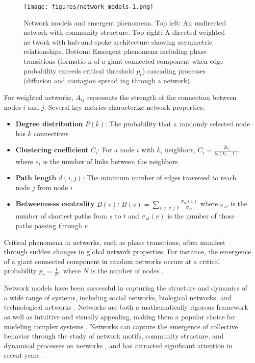 \begin{figure}[htbp]
    \centering
    \texttt{[image: figures/network\_models-1.png]}
    \caption{Network models and emergent phenomena. Top left: An undirected network with community structure. Top right: A directed weighted ne
    twork with hub-and-spoke architecture showing asymmetric relationships. Bottom: Emergent    phenomena including phase transitions (formatio
    n of a giant connected component when edge probability exceeds critical threshold $p_c$)    cascading processes (diffusion and contagion spread
    ing through a network).}
    \label{fig:network_models}
\end{figure}

For weighted networks, $A_{ij}$ represents the strength of the connection between nodes $i$ and $j$. Several key metrics characterize network properties:

\begin{itemize}
    \item \textbf{Degree distribution} $P(k)$: The probability that a randomly selected node has $k$ connections
    \item \textbf{Clustering coefficient} $C_i$: For a node $i$ with $k_i$ neighbors, $C_i = \frac{2e_i}{k_i(k_i-1)}$ where $e_i$ is the number of links between the neighbors
    \item \textbf{Path length} $d(i,j)$: The minimum number of edges traversed to reach node $j$ from node $i$
    \item \textbf{Betweenness centrality} $B(v)$: $B(v) = \sum_{s \neq v \neq t} \frac{\sigma_{st}(v)}{\sigma_{st}}$ where $\sigma_{st}$ is the number of shortest paths from $s$ to $t$ and $\sigma_{st}(v)$ is the number of those paths passing through $v$
\end{itemize}

Critical phenomena in networks, such as phase transitions, often manifest through sudden changes in global network properties. For instance, the emergence of a giant connected component in random networks occurs at a critical probability $p_c = \frac{1}{N}$, where $N$ is the number of nodes \citep{erdos1960evolution}.

Network models have been successful in capturing the structure and dynamics of a wide range of systems, including social networks, biological networks, and technological networks \citep{newman2003structure, albert2002statistical, strogatz2001exploring}. Networks are both a mathematically rigorous framework as well as intuitive and visually appealing, making them a popular choice for modeling complex systems \citep{newman2010networks}. Networks can capture the emergence of collective behavior through the study of network motifs, community structure, and dynamical processes on networks \citep{milo2002network, fortunato2010community, barrat2008dynamical}, and has attracted significant attention in recent years \citep{barabasi2016network}.

